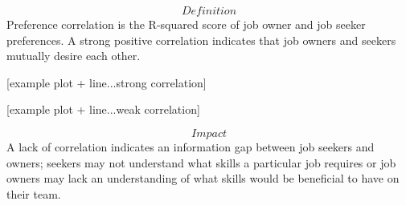 \[\textit{Definition}\]
Preference correlation is the R-squared score of job owner and job seeker preferences.  A strong positive correlation indicates that job owners and seekers mutually desire each other. 

[example plot + line...strong correlation]

[example plot + line...weak correlation]

\[\textit{Impact}\]
A lack of correlation indicates an information gap between job seekers and owners; seekers may not understand what skills a particular job requires or job owners may lack an understanding of what skills would be beneficial to have on their team. 